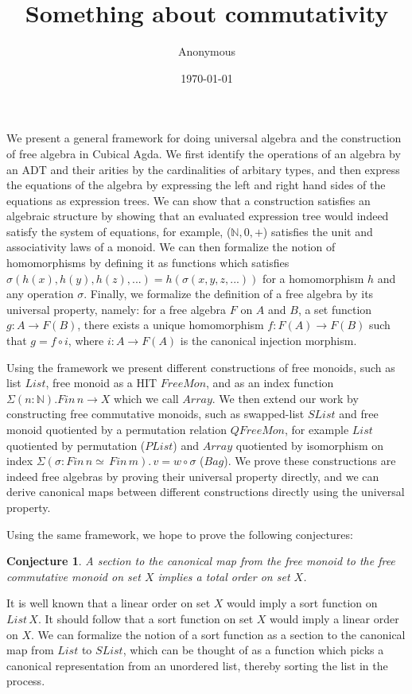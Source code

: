 \documentclass{article}
\title{Something about commutativity}
\author{Anonymous}
\date{\today}
\begin{document}
\maketitle

We present a general framework for doing universal algebra and the construction of
free algebra in Cubical Agda. We first identify the operations of an algebra by an ADT and their
arities by the cardinalities of arbitary types, and then express the equations of the algebra
by expressing the left and right hand sides of the equations as expression trees. We can
show that a construction satisfies an algebraic structure by showing that an evaluated expression
tree would indeed satisfy the system of equations, for example, ($\mathbb{N},0,+$) satisfies the
unit and associativity laws of a monoid. We can then formalize the notion of homomorphisms by 
defining it as functions which satisfies $\sigma(h(x),h(y),h(z),...) = h(\sigma(x,y,z,...))$ for
a homomorphism $h$ and any operation $\sigma$. Finally, we formalize the definition of a free algebra
by its universal property, namely: for a free algebra $F$ on $A$ and $B$, a set function 
$g : A \rightarrow F(B)$, there exists a unique homomorphism $f : F(A) \rightarrow F(B)$ such that
$g = f \circ i$, where $i : A \rightarrow F(A)$ is the canonical injection morphism. 

Using the framework we present different constructions of free monoids,
such as list $List$, free monoid as a HIT $FreeMon$, and as an index function $\Sigma (n : \mathbb{N}). Fin \, n \rightarrow X$ which we call $Array$.
We then extend our work by constructing free commutative monoids,
such as swapped-list $SList$ and free monoid quotiented by a permutation relation $QFreeMon$,
for example $List$ quotiented by permutation ($PList$)
and $Array$ quotiented by isomorphism on index $\Sigma (\sigma : Fin \, n \simeq \, Fin \, m). \, v = w \circ \sigma$ ($Bag$).
We prove these constructions are indeed free algebras by proving their universal property directly,
and we can derive canonical maps between different constructions directly using the universal property.

Using the same framework, we hope to prove the following conjectures:

\newtheorem{myconj}{Conjecture}
\newtheorem{mydef}{Definition}
\newtheorem{mylemma}{Lemma}
\newtheorem{mythm}{Theorem}

\begin{myconj}
    A section to the canonical map from the free monoid to the free commutative monoid on set $X$ implies a total order on set $X$.
\end{myconj}
It is well known that a linear order on set $X$ would imply a sort function on $List \, X$. It should follow that a sort function on set $X$
would imply a linear order on $X$. We can formalize the notion of a sort function as a section to the canonical map from $List$ to
$SList$, which can be thought of as a function which picks a canonical representation from an unordered list, thereby sorting
the list in the process.
\end{document}

